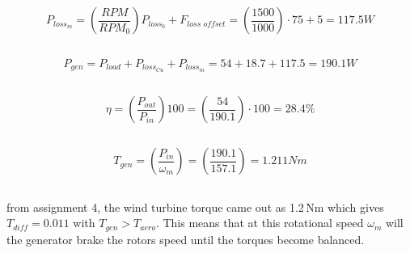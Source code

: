 \documentclass[11pt,a4paper]{article}
\newcommand{\Frac}[2]{\left(\frac{#1}{#2}\right)}
\begin{document}
\subsection{}
\begin{equation}
    P_{loss_m} = \Frac{RPM}{RPM_0}P_{loss_0} + F_{loss\,\,offset}
    = \Frac{1500}{1000}\cdot75 + 5 = 117.5\unit{W}
\end{equation}

\subsection{}
\begin{equation}
    P_{gen} = P_{load} + P_{loss_{Cu}} + P_{loss_m}
    = 54 + 18.7 + 117.5 = 190.1\unit{W}
\end{equation}

\subsection{}
\begin{equation}
    \eta = \Frac{P_{out}}{P_{in}}100 = \Frac{54}{190.1}\cdot100 = 28.4\%
\end{equation}

\subsection{}
\begin{equation}
    T_{gen} = \Frac{P_{in}}{\omega_m} = \Frac{190.1}{157.1} = 1.211\unit{Nm}
\end{equation}

\subsection{}
from assignment 4, the wind turbine torque came out as 1.2\,Nm which gives
$T_{diff} = 0.011$ with $T_{gen} > T_{aero}$. This means that at this rotational speed
$\omega_m$ will the generator brake the rotors speed until the torques become balanced.
\end{document}
